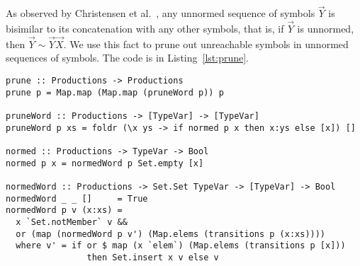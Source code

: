 
As observed by Christensen et
al.~\cite{DBLP:journals/iandc/ChristensenHS95}, any unnormed sequence
of symbols $\vec Y$ is bisimilar to its concatenation with any other
symbols, that is, if $\vec Y$ is unnormed, then
$\vec Y \sim \vec Y\vec X$.
%
%
We use this fact
to prune out unreachable symbols in unnormed sequences of symbols. The
code is in Listing~\ref{lst:prune}. 

\begin{lstlisting}[caption={Haskell code for the stage 2: pruning unnormed productions},label={lst:prune},captionpos=b]
prune :: Productions -> Productions
prune p = Map.map (Map.map (pruneWord p)) p

pruneWord :: Productions -> [TypeVar] -> [TypeVar]
pruneWord p xs = foldr (\x ys -> if normed p x then x:ys else [x]) []

normed :: Productions -> TypeVar -> Bool
normed p x = normedWord p Set.empty [x]

normedWord :: Productions -> Set.Set TypeVar -> [TypeVar] -> Bool
normedWord _ _ []     = True
normedWord p v (x:xs) =
  x `Set.notMember` v &&
  or (map (normedWord p v') (Map.elems (transitions p (x:xs))))
  where v' = if or $ map (x `elem`) (Map.elems (transitions p [x]))
                then Set.insert x v else v
\end{lstlisting}

